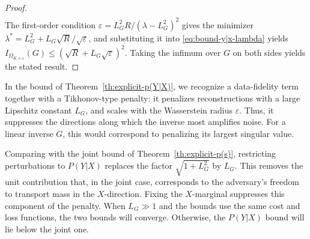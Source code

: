 \documentclass{article}
\newcommand{\Okc}{\Omega_{K, c, \varepsilon}}
\theoremstyle{definition}
\theoremstyle{remarksty}
\begin{document}
\begin{proof}
\begin{align}
\end{align}
The first-order condition $\varepsilon = L_G^2 R/(\lambda - L_G^2)^2$ gives the minimizer $\lambda^* = L_G^2 + L_G\sqrt{R}/\sqrt{\varepsilon}$, and substituting it into \eqref{eq:bound-y|x-lambda} yields $I_{\Okc}(G) \leq (\sqrt{R} + L_G\sqrt{\varepsilon})^2$. Taking the infimum over $G$ on both sides yields the stated result.
\end{proof}

In the bound of Theorem~\ref{th:explicit-p(Y|X)}, we recognize a data-fidelity term together with a Tikhonov-type penalty: it penalizes reconstructions with a large Lipschitz constant $L_G$, and scales with the Wasserstein radius $\varepsilon$. Thus, it suppresses the directions along which the inverse most amplifies noise. For a linear inverse $G$, this would correspond to penalizing its largest singular value.

Comparing with the joint bound of Theorem~\ref{th:explicit-p(s)}, restricting perturbations to $P(Y|X)$ replaces the factor $\sqrt{1+L_G^2}$ by $L_G$. This removes the unit contribution that, in the joint case, corresponds to the adversary's freedom to transport mass in the $X$-direction. Fixing the $X$-marginal suppresses this component of the penalty. When $L_G\gg 1$ and the bounds use the same cost and loss functions, the two bounds will converge. Otherwise, the $P(Y|X)$ bound will lie below the joint one. 
\end{document}

